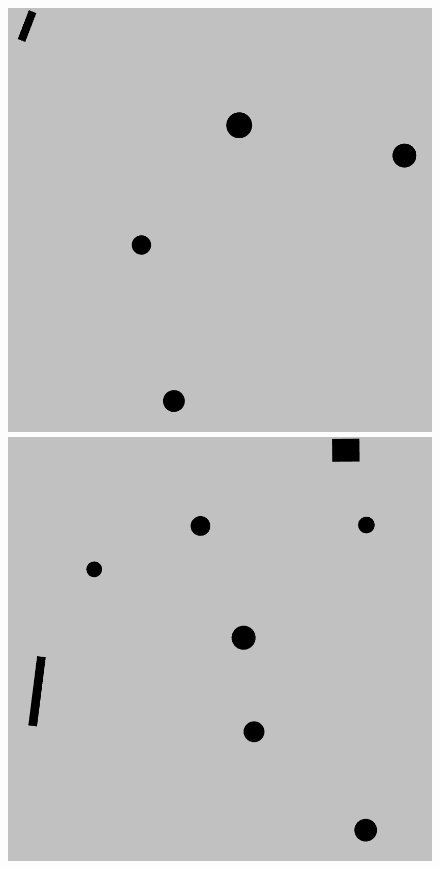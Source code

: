 \documentclass{beamer}
\begin{document}
\begin{frame}
\begin{figure}[H]
\begin{columns}
						\begin{column}{0.14\textwidth}
							\includegraphics[width=1\linewidth]{graphics/test_model_05_2.png}
							\includegraphics[width=1\linewidth]{graphics/test_model_08_2.png}

\end{column}
\end{columns}
\end{figure}
\end{frame}
\end{document}
